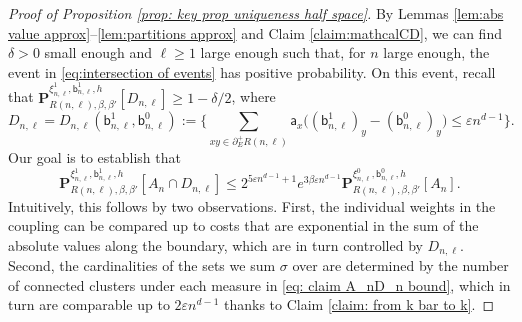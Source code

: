 \documentclass[11pt,a4paper]{article}
\numberwithin{equation}{section}
\theoremstyle{plain}
\theoremstyle{definition}
\begin{document}
\begin{proof}[Proof of Proposition \textup{\ref{prop: key prop uniqueness half space}}]
By Lemmas \ref{lem:abs value approx}--\ref{lem:partitions approx} and Claim \ref{claim:mathcalCD}, we can find $\delta>0$ small enough and $\ell\geq 1$ large enough such that, for $n$ large enough, the event in \eqref{eq:intersection of events} has positive probability.
On this event, recall that $\mathbf P^{\xi^1_{n,\ell}, \mathsf b^1_{n,\ell},h}_{R(n,\ell), \beta, \beta'}[D_{n,\ell}] \geq 1-\delta/2$, where
\begin{equation}
    D_{n,\ell}=D_{n,\ell}(\mathsf{b}_{n,\ell}^1,\mathsf{b}_{n,\ell}^0):= \Big\{ \sum_{xy \in \partial^{+}_E R(n,\ell)} \mathsf a_x \Big((\mathsf b^1_{n,\ell})_y - (\mathsf b^0_{n,\ell})_y\Big)\leq \varepsilon n^{d-1}\Big\}.
\end{equation}
Our goal is to establish that
\begin{equation} \label{eq: claim A_nD_n bound}
\mathbf P^{\xi^1_{n,\ell}, \mathsf{b}^1_{n,\ell}, h}_{R(n,\ell),\beta,\beta'}[A_n \cap D_{n,\ell}] \leq 2^{5\varepsilon n^{d-1}+1} e^{3\beta \varepsilon n^{d-1}}  \mathbf P^{\xi^0_{n,\ell}, \mathsf{b}^0_{n,\ell}, h}_{R(n,\ell),\beta,\beta'}[A_n ].
\end{equation}
Intuitively, this follows by two observations. First, the individual weights in the coupling can be compared up to costs that are exponential in the sum of the absolute values along the boundary, which are in turn controlled by $D_{n,\ell}$. Second, the cardinalities of the sets we sum $\sigma$ over are determined by the number of connected clusters under each measure in \eqref{eq: claim A_nD_n bound}, 
which in turn are comparable up to $2\varepsilon n^{d-1}$ thanks to Claim \ref{claim: from k bar to k}. 


\end{proof}
\end{document}
